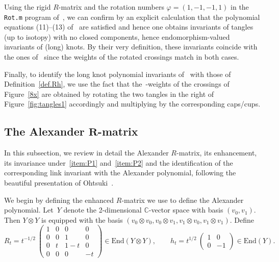 \documentclass[pdftex]{sigma}
\numberwithin{equation}{section}
\theoremstyle{definition}
\begin{document}
Using the rigid $R$-matrix and the rotation numbers $\varphi=(1,-1,-1,1)$ in the
\texttt{Rot.m} program of~\cite[Section~2]{BNV:PG}, we can confirm by an explicit
calculation that the polynomial equations (11)--(13) of~\cite{BNV:PG} are satisfied
and hence one obtains invariants of tangles (up to isotopy) with no closed
components, hence endomorphism-valued invariants of (long) knots. By their very
definition, these invariants coincide with the ones of~\cite{GK:multi} since the weights
of the rotated crossings match in both cases.

Finally, to identify the long knot polynomial invariants of~\cite{GK:multi} with those
of Definition~\ref{def.Rh}, we use the fact that the~\cite{GK:multi}-weights of the
crossings of Figure~\ref{8x} are obtained by rotating the two tangles in the
right of Figure~\ref{fig:tangles1} accordingly and multiplying by the corresponding
caps/cups.

\subsection[The Alexander R-matrix]{The Alexander $\boldsymbol{R}$-matrix}
\label{sub:alex}

In this subsection, we review in detail the Alexander $R$-matrix, its enhancement,
its invariance under~\eqref{item:P1} and~\eqref{item:P2} and the identification
of the corresponding link invariant with the Alexander polynomial, following
the beautiful presentation of Ohtsuki~\cite{Ohtsuki}.

We begin by defining the enhanced $R$-matrix we use to define the Alexander polynomial.
Let~$Y$ denote the 2-dimensional $\mathbb{C}$-vector space with basis
$(v_0, v_1)$. Then $Y \otimes Y$ is equipped with the basis
$(v_0 \otimes v_0, v_0 \otimes v_1, v_1 \otimes v_0, v_1 \otimes v_1)$.
Define
\begin{equation}
\label{alexRh}
R_t = t^{-1/2}~\begin{pmatrix}
1 & 0 & 0 & 0 \\
0 & 0 & 1 & 0 \\
0 & t & 1-t & 0 \\
0 & 0 & 0 & -t
\end{pmatrix} \in \mathrm{End}(Y \otimes Y), \qquad h_t = t^{1/2}~\begin{pmatrix}
1 & 0 \\
0 & -1
\end{pmatrix} \in \mathrm{End}(Y) .
\end{equation}
\end{document}
